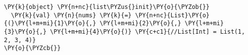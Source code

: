 \begin{Verbatim}[commandchars=\\\{\}]
\PY{k}{object} \PY{n+nc}{list\PYZus{}init}\PY{o}{\PYZob{}}
  \PY{k}{val} \PY{n}{nums} \PY{k}{=} \PY{n+nc}{List}\PY{o}{(}\PY{l+m+mi}{1}\PY{o}{,} \PY{l+m+mi}{2}\PY{o}{,} \PY{l+m+mi}{3}\PY{o}{,} \PY{l+m+mi}{4}\PY{o}{)} \PY{c+c1}{//List[Int] = List(1, 2, 3, 4)}
\PY{o}{\PYZcb{}}
\end{Verbatim}
